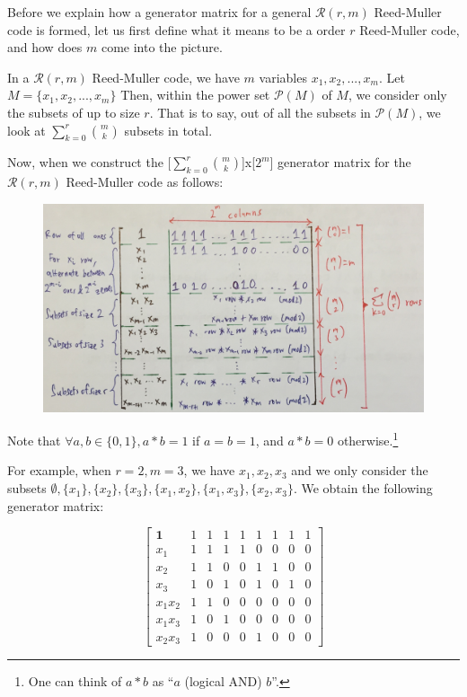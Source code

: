 \documentclass[12pt, a4paper]{article}
\begin{document}
Before we explain how a generator matrix for a general $\mathcal{R}(r,m)$ Reed-Muller code is formed, let us first define what it means to be a order $r$ Reed-Muller code, and how does $m$ come into the picture.

In a $\mathcal{R}(r,m)$ Reed-Muller code, we have $m$ variables $x_1, x_2, ... , x_m$. Let $M = \{x_1, x_2, ... , x_m\}$ Then, within the power set $\mathcal{P}(M)$ of $M$, we consider only the subsets of up to size $r$. That is to say, out of all the subsets in $\mathcal{P}(M)$, we look at $\sum_{k=0}^{r} \binom{m}{k}$ subsets in total.

Now, when we construct the [$\sum_{k=0}^{r} \binom{m}{k}$]x[$2^m$] generator matrix for the $\mathcal{R}(r,m)$ Reed-Muller code as follows:
\begin{figure}[H]
	\centering
	\includegraphics[width=\textwidth]{reedmuller_diagram.jpg}
\end{figure}

Note that $\forall a, b \in \{0,1\}, a * b = 1$ if $a = b = 1$, and $a * b = 0$ otherwise.\footnote{One can think of $a * b$ as ``$a$ (logical AND) $b$''.}

For example, when $r = 2, m = 3$, we have $x_1, x_2, x_3$ and we only consider the subsets $\emptyset, \{x_1\}, \{x_2\}, \{x_3\}, \{x_1, x_2\}, \{x_1, x_3\}, \{x_2, x_3\}$. We obtain the following generator matrix:

$$
\left[
\begin{array}{c|cccccccc}
\textbf{1} 			& 1 & 1 & 1 & 1 & 1 & 1 & 1 & 1\\
\textbf{$x_1$} 		& 1 & 1 & 1 & 1 & 0 & 0 & 0 & 0\\
\textbf{$x_2$} 		& 1 & 1 & 0 & 0 & 1 & 1 & 0 & 0\\
\textbf{$x_3$} 		& 1 & 0 & 1 & 0 & 1 & 0 & 1 & 0\\
\textbf{$x_1x_2$} 	& 1 & 1 & 0 & 0 & 0 & 0 & 0 & 0\\
\textbf{$x_1x_3$} 	& 1 & 0 & 1 & 0 & 0 & 0 & 0 & 0\\
\textbf{$x_2x_3$} 	& 1 & 0 & 0 & 0 & 1 & 0 & 0 & 0
\end{array}
\right]
$$
\end{document}
